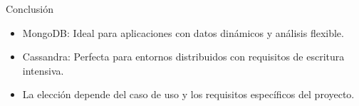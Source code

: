 \documentclass[presentation]{beamer}
\begin{document}
\begin{frame}[label={sec:org2798ed1}]{Conclusión}
\begin{itemize}
\item \alert{\alert{MongoDB}}: Ideal para aplicaciones con datos dinámicos y análisis flexible.
\item \alert{\alert{Cassandra}}: Perfecta para entornos distribuidos con requisitos de escritura intensiva.
\item La elección depende del caso de uso y los requisitos específicos del proyecto.
\end{itemize}
\end{frame}
\end{document}
